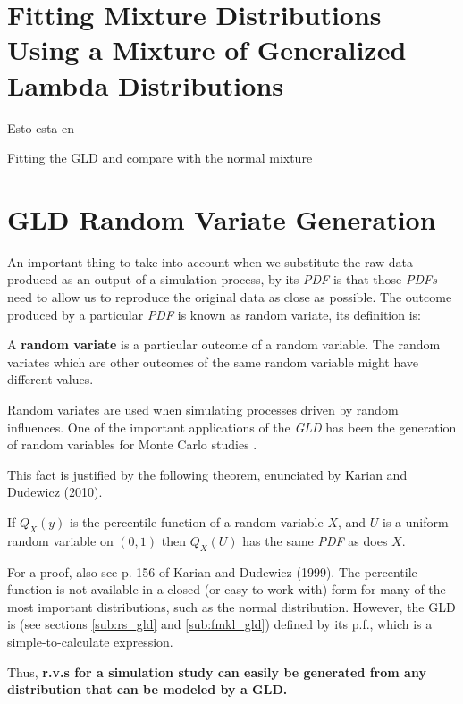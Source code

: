 \section{Fitting Mixture Distributions Using a Mixture of Generalized Lambda Distributions}
Esto esta en \cite{Tobergte2013}

Fitting the GLD and compare with the normal mixture \cite{Ning2008}

\section{GLD Random Variate Generation}
An important thing to take into account when we substitute the raw data produced as an output of a simulation process, by its \textit{PDF} is that those \textit{PDFs} need to allow us to reproduce the original data as close as possible. The outcome produced by a particular \textit{PDF} is known as random variate, its definition is:

\begin{defn} 
A \textbf{random variate} is a particular outcome of a random variable. The random variates which are other outcomes of the same random variable might have different values.
\end{defn}

Random variates are used when simulating processes driven by random influences. One of the important applications of the \textit{GLD} has been the generation of random variables for Monte Carlo studies \cite{Mustafa2016}.

This fact is justified by the following theorem, enunciated by Karian and Dudewicz (2010).

\begin{thm}
If $Q_{X}(y)$ is the percentile function of a random variable $X$, and $U$ is a uniform random variable
on $(0, 1)$ then $Q_{X}(U)$ has the same \textit{PDF} as does $X$.
\end{thm}

For a proof, also see p. 156 of Karian and Dudewicz (1999). The percentile function is not available in a closed (or easy-to-work-with) form for many of the most important distributions, such as the normal distribution. However, the GLD is (see sections \ref{sub:rs_gld} and \ref{sub:fmkl_gld}) defined by its p.f., which is a simple-to-calculate expression.

Thus, \textbf{r.v.s for a simulation study can easily be generated from any distribution that can be modeled by a GLD.}

